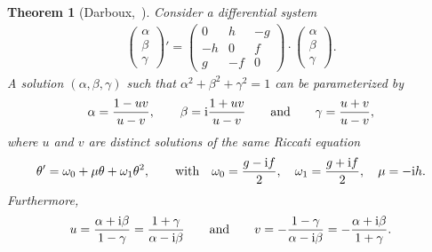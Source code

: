 \documentclass[10pt,a4paper]{amsart}
\numberwithin{equation}{section}
\newtheorem{Theorem}{Theorem}[section]
\begin{document}
\begin{Theorem}[{Darboux,~\cite[Chapter~II, pp.~30--31]{da3}}]\label{tso3dar}
Consider a differential system
\begin{gather}\label{etso3dar}
 \begin{pmatrix} \alpha \\ \beta \\ \gamma \end{pmatrix}' = \begin{pmatrix} 0 & h & -g \\ -h & 0 & f \\ g & -f & 0 \end{pmatrix} \cdot \begin{pmatrix} \alpha \\ \beta \\ \gamma \end{pmatrix}\!.
\end{gather}
A solution $(\alpha, \beta, \gamma)$ such that $\alpha^2+\beta^2+\gamma^2=1$
can be parameterized by
\begin{gather}\label{etso3dar2}
\alpha=\dfrac{1-uv}{u-v}, \qquad
\beta={\rm i} \dfrac{1+uv}{u-v} \qquad \text{and} \qquad \gamma= \dfrac{u+v}{u-v},
\end{gather}
where $u$ and $v$ are distinct solutions of the same Riccati equation
\begin{gather*}%
\theta'= \omega_0+\mu\theta+{\omega_1}\theta^2, \qquad \textrm{with} \quad
 \omega_0= \dfrac{g-{\rm i} f}{2}, \quad \omega_1= \dfrac{g+{\rm i} f}{2},
 \quad \mu=-{\rm i} h.
\end{gather*}
Furthermore,
\begin{gather*}%
u=\dfrac{\alpha+{\rm i}\beta}{ 1-\gamma} = \dfrac{1+\gamma
}{\alpha-{\rm i}\beta} \qquad \text{and} \qquad v=-\dfrac{1-\gamma}{\alpha-{\rm i}\beta} = -\dfrac{\alpha+{\rm i}\beta}{1+\gamma}.
\end{gather*}
\end{Theorem}
\end{document}
